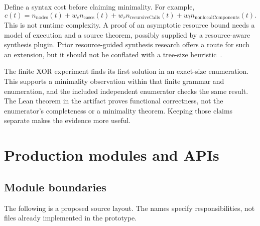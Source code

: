 Define a syntax cost before claiming minimality. For example,
\[
 c(t)=n_{\mathrm{nodes}}(t)+w_c n_{\mathrm{cases}}(t)+
 w_r n_{\mathrm{recursiveCalls}}(t)+w_l n_{\mathrm{nonlocalComponents}}(t).
\]
This is not runtime complexity. A proof of an asymptotic resource bound needs a model of execution and a source theorem, possibly supplied by a resource-aware synthesis plugin. Prior resource-guided synthesis research offers a route for such an extension, but it should not be conflated with a tree-size heuristic~\cite{resyn}.

The finite XOR experiment finds its first solution in an exact-size enumeration. This supports a minimality observation within that finite grammar and enumeration, and the included independent enumerator checks the same result. The Lean theorem in the artifact proves functional correctness, not the enumerator's completeness or a minimality theorem. Keeping those claims separate makes the evidence more useful.

\section{Production modules and APIs}
\label{sec:modules}

\subsection{Module boundaries}

The following is a proposed source layout. The names specify responsibilities, not files already implemented in the prototype.

